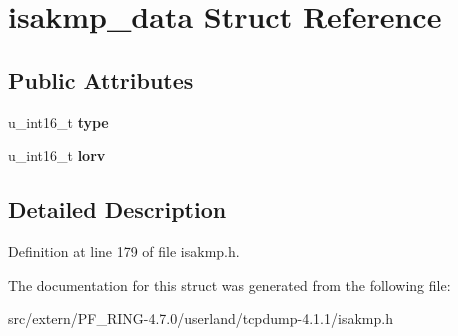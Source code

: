\hypertarget{structisakmp__data}{
\section{isakmp\_\-data Struct Reference}
\label{structisakmp__data}
}
\subsection*{Public Attributes}
\begin{DoxyCompactItemize}
\item 
\hypertarget{structisakmp__data_a308cd4fd18d9dfa4c2befeb4ed058619}{
u\_\-int16\_\-t {\bfseries type}}
\label{structisakmp__data_a308cd4fd18d9dfa4c2befeb4ed058619}

\item 
\hypertarget{structisakmp__data_afd5d1e530a5b4ccf3b2355d94b275d11}{
u\_\-int16\_\-t {\bfseries lorv}}
\label{structisakmp__data_afd5d1e530a5b4ccf3b2355d94b275d11}

\end{DoxyCompactItemize}


\subsection{Detailed Description}


Definition at line 179 of file isakmp.h.



The documentation for this struct was generated from the following file:\begin{DoxyCompactItemize}
\item 
src/extern/PF\_\-RING-\/4.7.0/userland/tcpdump-\/4.1.1/isakmp.h\end{DoxyCompactItemize}
